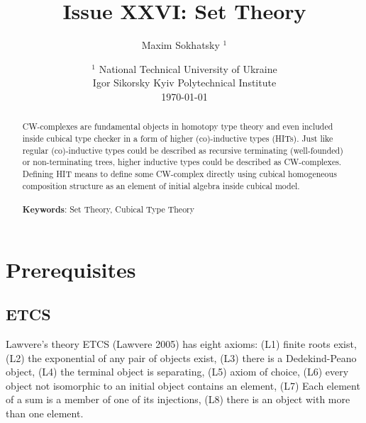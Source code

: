 \documentclass{article}
\theoremstyle{definition}
\begin{document}
\title{Issue XXVI: Set Theory}
\author{Maxim Sokhatsky $^1$}
\date{ $^1$ National Technical University of Ukraine \\
       \small Igor Sikorsky Kyiv Polytechnical Institute \\
       \today }

\maketitle

\begin{abstract}
CW-complexes are fundamental objects in homotopy type theory
and even included inside cubical type checker in a form of
higher (co)-inductive types (HITs).
Just like regular (co)-inductive types could be described as recursive
terminating (well-founded) or non-terminating trees,
higher inductive types could be described as CW-complexes.
Defining HIT means to define some CW-complex
directly using cubical homogeneous composition structure as an
element of initial algebra inside cubical model.
\\
\\
{\bf Keywords}: Set Theory, Cubical Type Theory
\end{abstract}
\tableofcontents

\newpage
\section{Prerequisites}

\subsection{ETCS}
Lawvere’s theory ETCS (Lawvere 2005) has eight axioms:
(L1) finite roots exist,
(L2) the exponential of any pair of objects exist,
(L3) there is a Dedekind-Peano object,
(L4) the terminal object is separating,
(L5) axiom of choice,
(L6) every object not isomorphic to an initial object contains an element,
(L7) Each element of a sum is a member of one of its injections,
(L8) there is an object with more than one element.




\end{document}
